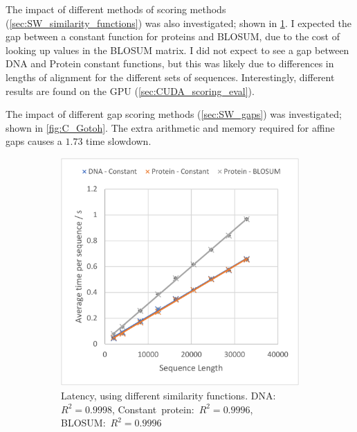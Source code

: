 The impact of different methods of scoring methods (\cref{sec:SW_similarity_functions}) was also investigated; shown in \cref{fig:C_similarity_fun}.
I expected the gap between a constant function for proteins and BLOSUM, due to the cost of looking up values in the BLOSUM matrix.
I did not expect to see a gap between DNA and Protein constant functions, but this was likely due to differences in lengths of alignment for the different sets of sequences.
Interestingly, different results are found on the GPU (\cref{sec:CUDA_scoring_eval}).

The impact of different gap scoring methods (\cref{sec:SW_gaps}) was investigated; shown in \cref{fig:C_Gotoh}.
The extra arithmetic and memory required for affine gaps causes a $1.73$ time slowdown.

\begin{figure}
    \centering
    \begin{subfigure}{.49\textwidth}
      \centering
      \includegraphics[width=\linewidth]{figs/eval/cu_similarity_f.pdf}
      \caption{Latency, using different similarity functions. DNA: $R^2=0.9998$, Constant~protein:~${R^2=0.9996}$, BLOSUM:~${R^2=0.9996}$}
      \label{fig:C_similarity_fun}
    \end{subfigure}
    \hfill
    \begin{subfigure}{.49\textwidth}
      \centering

\end{subfigure}
\end{figure}
